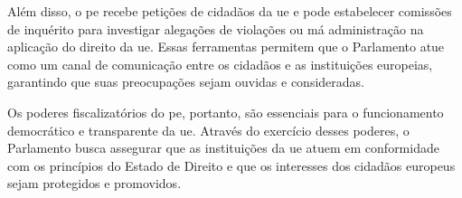 Além disso, o \acrshort{pe} recebe petições de cidadãos da \acrshort{ue} e pode estabelecer comissões de inquérito para investigar alegações de violações ou má administração na aplicação do direito da \acrshort{ue}. Essas ferramentas permitem que o Parlamento atue como um canal de comunicação entre os cidadãos e as instituições europeias, garantindo que suas preocupações sejam ouvidas e consideradas.

Os poderes fiscalizatórios do \acrshort{pe}, portanto,  são essenciais para o funcionamento democrático e transparente da \acrshort{ue}. Através do exercício desses poderes, o Parlamento busca assegurar que as instituições da \acrshort{ue} atuem em conformidade com os princípios do Estado de Direito e que os interesses dos cidadãos europeus sejam protegidos e promovidos.

